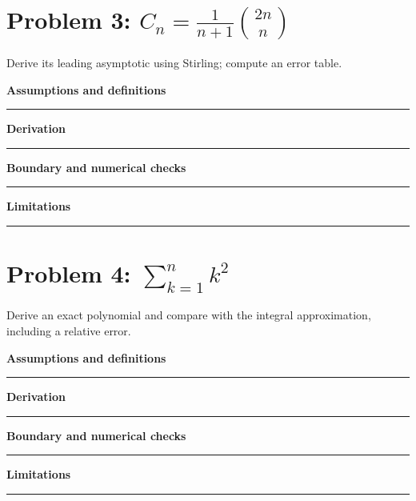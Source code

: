 \documentclass[11pt]{article}
\begin{document}
\section{\texorpdfstring{Problem 3: $C_n=\frac{1}{n+1}\binom{2n}{n}$}{Problem 3: Catalan-number formula}}
Derive its leading asymptotic using Stirling; compute an error table.\par\medskip
\textbf{Assumptions and definitions}\par\vspace{0.7cm}\hrule\vspace{0.35cm}
\textbf{Derivation}\par\vspace{2.1cm}\hrule\vspace{0.3cm}
\textbf{Boundary and numerical checks}\par\vspace{1.1cm}\hrule\vspace{0.35cm}
\textbf{Limitations}\par\vspace{0.9cm}\hrule\vspace{0.35cm}
\section{\texorpdfstring{Problem 4: $\sum_{k=1}^{n}k^2$}{Problem 4: Sum of squares from 1 to n}}
Derive an exact polynomial and compare with the integral approximation, including a relative error.\par\medskip
\textbf{Assumptions and definitions}\par\vspace{0.7cm}\hrule\vspace{0.35cm}
\textbf{Derivation}\par\vspace{2.1cm}\hrule\vspace{0.3cm}
\textbf{Boundary and numerical checks}\par\vspace{1.1cm}\hrule\vspace{0.35cm}
\textbf{Limitations}\par\vspace{0.9cm}\hrule\vspace{0.35cm}
\end{document}
